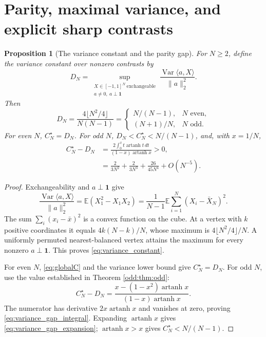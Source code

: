 \documentclass[11pt,a4paper]{article}
\newtheorem{proposition}[theorem]{Proposition}
\DeclareMathOperator{\Var}{Var}\DeclareMathOperator{\Cov}{Cov}\DeclareMathOperator{\Hyp}{Hyp}\DeclareMathOperator{\Bern}{Bern}\DeclareMathOperator{\supp}{supp}\DeclareMathOperator{\artanh}{artanh}
\newcommand{\E}{\mathbb E}\newcommand{\R}{\mathbb R}\newcommand{\N}{\mathbb N}\newcommand{\one}{\mathbf1}
\begin{document}
\section{Parity, maximal variance, and explicit sharp contrasts}\label{sec:parity}
\begin{proposition}[The variance constant and the parity gap]\label{prop:variance_parity}
For $N\ge2$, define the variance constant over nonzero contrasts by
\[
 D_N=\sup_{\substack{X\in[-1,1]^N\ \mathrm{exchangeable}\\a\ne0,\ a\perp\one}}
 \frac{\Var\langle a,X\rangle}{\|a\|_2^2}.
\]
Then
\begin{equation}\label{eq:variance_constant}
 D_N=\frac{4\lfloor N^2/4\rfloor}{N(N-1)}
 =\begin{cases}N/(N-1),&N\text{ even},\\(N+1)/N,&N\text{ odd}.
 \end{cases}
\end{equation}
For even $N$, $C_N^\star=D_N$. For odd $N$, $D_N<C_N^\star<N/(N-1)$, and, with $x=1/N$,
\begin{align}
 C_N^\star-D_N
 &=\frac{2\int_0^x t\operatorname{artanh}t\,dt}
 {(1-x)\operatorname{artanh}x}>0,\label{eq:variance_gap_integral}\\
 &=\frac{2}{3N^2}+\frac{2}{3N^3}+\frac{26}{45N^4}+O(N^{-5}).\label{eq:variance_gap_expansion}
\end{align}
\end{proposition}
\begin{proof}
Exchangeability and $a\perp\one$ give
\[
 \frac{\Var\langle a,X\rangle}{\|a\|_2^2}
 =\E(X_1^2-X_1X_2)
 =\frac1{N-1}\E\sum_{i=1}^N(X_i-\bar X_N)^2.
\]
The sum $\sum_i(x_i-\bar x)^2$ is a convex function on the cube. At a vertex with $k$ positive coordinates it equals $4k(N-k)/N$, whose maximum is $4\lfloor N^2/4\rfloor/N$. A uniformly permuted nearest-balanced vertex attains the maximum for every nonzero $a\perp\one$. This proves \eqref{eq:variance_constant}.

For even $N$, \eqref{eq:globalC} and the variance lower bound give $C_N^\star=D_N$. For odd $N$, use the value established in Theorem \ref{odd:thm:odd}:
\[
 C_N^\star-D_N
 =\frac{x-(1-x^2)\operatorname{artanh}x}
 {(1-x)\operatorname{artanh}x}.
\]
The numerator has derivative $2x\operatorname{artanh}x$ and vanishes at zero, proving \eqref{eq:variance_gap_integral}. Expanding $\operatorname{artanh}x$ gives \eqref{eq:variance_gap_expansion}; $\operatorname{artanh}x>x$ gives $C_N^\star<N/(N-1)$.
\end{proof}
\end{document}
